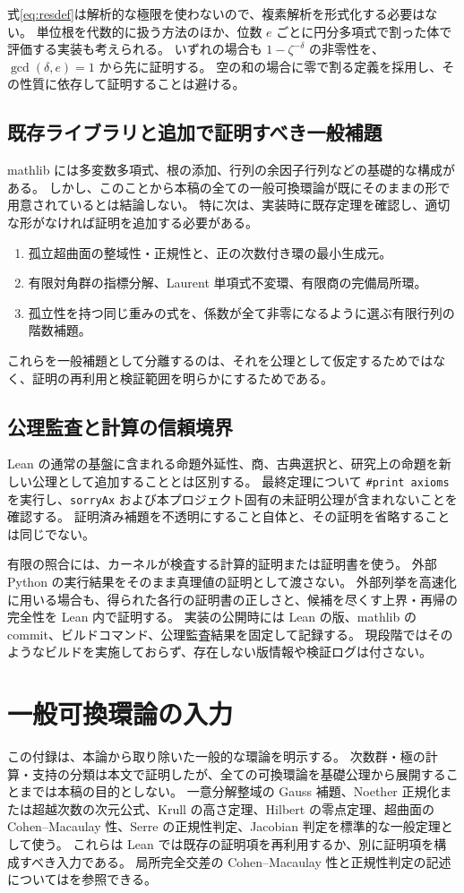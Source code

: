 \documentclass[11pt,a4paper]{ltjsarticle}
\numberwithin{equation}{section}
\theoremstyle{definition}
\begin{document}
式\eqref{eq:resdef}は解析的な極限を使わないので、複素解析を形式化する必要はない。
単位根を代数的に扱う方法のほか、位数 $e$ ごとに円分多項式で割った体で評価する実装も考えられる。
いずれの場合も $1-\zeta^{-\delta}$ の非零性を、$\gcd(\delta,e)=1$ から先に証明する。
空の和の場合に零で割る定義を採用し、その性質に依存して証明することは避ける。

\subsection{既存ライブラリと追加で証明すべき一般補題}
mathlib には多変数多項式、根の添加、行列の余因子行列などの基礎的な構成がある\cite{mathlibMv,mathlibRoot,mathlibAdj}。
しかし、このことから本稿の全ての一般可換環論が既にそのままの形で用意されているとは結論しない。
特に次は、実装時に既存定理を確認し、適切な形がなければ証明を追加する必要がある。
\begin{enumerate}
\item 孤立超曲面の整域性・正規性と、正の次数付き環の最小生成元。
\item 有限対角群の指標分解、Laurent 単項式不変環、有限商の完備局所環。
\item 孤立性を持つ同じ重みの式を、係数が全て非零になるように選ぶ有限行列の階数補題。
\end{enumerate}
これらを一般補題として分離するのは、それを公理として仮定するためではなく、証明の再利用と検証範囲を明らかにするためである。

\subsection{公理監査と計算の信頼境界}
Lean の通常の基盤に含まれる命題外延性、商、古典選択と、研究上の命題を新しい公理として追加することとは区別する\cite{LeanAxioms}。
最終定理について \texttt{\#print axioms} を実行し、\texttt{sorryAx} および本プロジェクト固有の未証明公理が含まれないことを確認する。
証明済み補題を不透明にすること自体と、その証明を省略することは同じでない。

有限の照合には、カーネルが検査する計算的証明または証明書を使う。
外部 Python の実行結果をそのまま真理値の証明として渡さない。
外部列挙を高速化に用いる場合も、得られた各行の証明書の正しさと、候補を尽くす上界・再帰の完全性を Lean 内で証明する。
実装の公開時には Lean の版、mathlib の commit、ビルドコマンド、公理監査結果を固定して記録する。
現段階ではそのようなビルドを実施しておらず、存在しない版情報や検証ログは付さない。

\appendix
\section{一般可換環論の入力}\label{app:commutative}
この付録は、本論から取り除いた一般的な環論を明示する。
次数群・極の計算・支持の分類は本文で証明したが、全ての可換環論を基礎公理から展開することまでは本稿の目的としない。
一意分解整域の Gauss 補題、Noether 正規化または超越次数の次元公式、Krull の高さ定理、Hilbert の零点定理、超曲面の Cohen--Macaulay 性、Serre の正規性判定、Jacobian 判定を標準的な一般定理として使う。
これらは Lean では既存の証明項を再利用するか、別に証明項を構成すべき入力である。
局所完全交差の Cohen--Macaulay 性と正規性判定の記述については\cite{StacksCI,StacksNormal}を参照できる。
\end{document}
